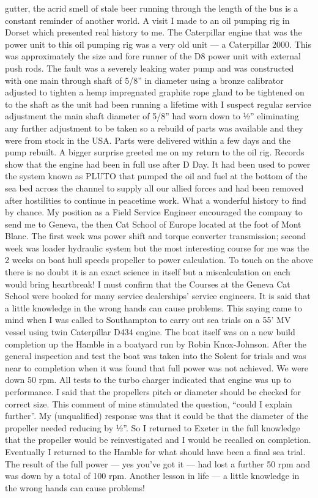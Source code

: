 gutter, the acrid smell of stale beer running through the length of the bus is
a constant reminder of another world. A visit I made to an oil pumping rig in
Dorset which presented real history to me. The Caterpillar engine that was the
power unit to this oil pumping rig was a very old unit --- a Caterpillar 2000.
This was approximately the size and fore runner of the D8 power unit with
external push rods. The fault was a severely leaking water pump and was
constructed with one main through shaft of 5/8'' in diameter using a bronze
calibrator adjusted to tighten a hemp impregnated graphite rope gland to be
tightened on to the shaft as the unit had been running a lifetime with I
suspect regular service adjustment the main shaft diameter of 5/8'' had worn
down to ½'' eliminating any further adjustment to be taken so a rebuild of
parts was available and they were from stock in the USA. Parts were delivered
within a few days and the pump rebuilt. A bigger surprise greeted me on my
return to the oil rig. Records show that the engine had been in full use after
D Day. It had been used to power the system known as PLUTO that pumped the oil
and fuel at the bottom of the sea bed across the channel to supply all our
allied forces and had been removed after hostilities to continue in peacetime
work. What a wonderful history to find by chance. My position as a Field
Service Engineer encouraged the company to send me to Geneva, the then Cat
School of Europe located at the foot of Mont Blanc. The first week was power
shift and torque converter transmission; second week was loader hydraulic
system but the most interesting course for me was the 2 weeks on boat hull
speeds propeller to power calculation. To touch on the above there is no doubt
it is an exact science in itself but a miscalculation on each would bring
heartbreak! I must confirm that the Courses at the Geneva Cat School were
booked for many service dealerships' service engineers. It is said that a
little knowledge in the wrong hands can cause problems. This saying came to
mind when I was called to Southampton to carry out sea trials on a 55' MV
vessel using twin Caterpillar D434 engine. The boat itself was on a new build
completion up the Hamble in a boatyard run by Robin Knox-Johnson. After the
general inspection and test the boat was taken into the Solent for trials and
was near to completion when it was found that full power was not achieved. We
were down 50 rpm. All tests to the turbo charger indicated that engine was up
to performance. I said that the propellers pitch or diameter should be checked
for correct size. This comment of mine stimulated the question, ``could I
explain further''. My (unqualified) response was that it could be that the
diameter of the propeller needed reducing by ½''. So I returned to Exeter in
the full knowledge that the propeller would be reinvestigated and I would be
recalled on completion. Eventually I returned to the Hamble for what should
have been a final sea trial. The result of the full power --- yes you've got
it --- had lost a further 50 rpm and was down by a total of 100 rpm. Another
lesson in life --- a little knowledge in the wrong hands can cause problems!
